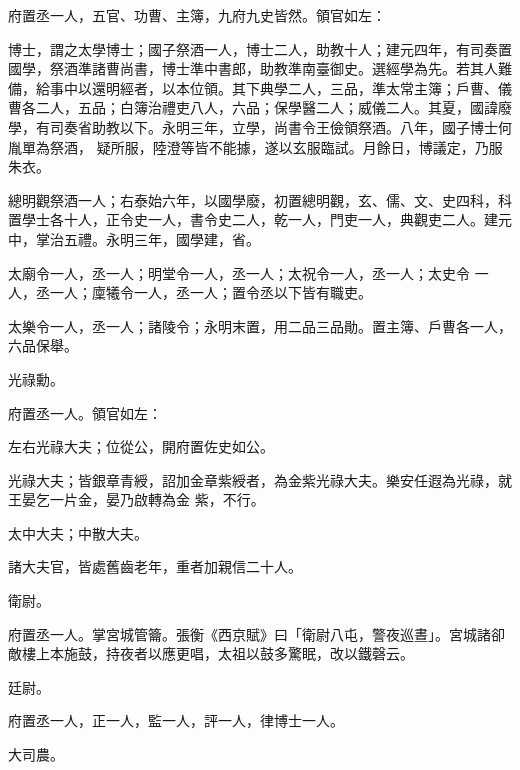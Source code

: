 \begin{pinyinscope}
 府置丞一人，五官、功曹、主簿，九府九史皆然。領官如左：



 博士，謂之太學博士；國子祭酒一人，博士二人，助教十人；建元四年，有司奏置國學，祭酒準諸曹尚書，博士準中書郎，助教準南臺御史。選經學為先。若其人難備，給事中以還明經者，以本位領。其下典學二人，三品，準太常主簿；戶曹、儀曹各二人，五品；白簿治禮吏八人，六品；保學醫二人；威儀二人。其夏，國諱廢學，有司奏省助教以下。永明三年，立學，尚書令王儉領祭酒。八年，國子博士何胤單為祭酒，
 疑所服，陸澄等皆不能據，遂以玄服臨試。月餘日，博議定，乃服朱衣。



 總明觀祭酒一人；右泰始六年，以國學廢，初置總明觀，玄、儒、文、史四科，科置學士各十人，正令史一人，書令史二人，乾一人，門吏一人，典觀吏二人。建元中，掌治五禮。永明三年，國學建，省。



 太廟令一人，丞一人；明堂令一人，丞一人；太祝令一人，丞一人；太史令
 一人，丞一人；廩犧令一人，丞一人；置令丞以下皆有職吏。



 太樂令一人，丞一人；諸陵令；永明末置，用二品三品勛。置主簿、戶曹各一人，六品保舉。



 光祿勳。



 府置丞一人。領官如左：



 左右光祿大夫；位從公，開府置佐史如公。



 光祿大夫；皆銀章青綬，詔加金章紫綬者，為金紫光祿大夫。樂安任遐為光祿，就王晏乞一片金，晏乃啟轉為金
 紫，不行。



 太中大夫；中散大夫。



 諸大夫官，皆處舊齒老年，重者加親信二十人。



 衛尉。



 府置丞一人。掌宮城管籥。張衡《西京賦》曰「衛尉八屯，警夜巡晝」。宮城諸卻敵樓上本施鼓，持夜者以應更唱，太祖以鼓多驚眠，改以鐵磬云。



 廷尉。



 府置丞一人，正一人，監一人，評一人，律博士一人。



 大司農。




\end{pinyinscope}
